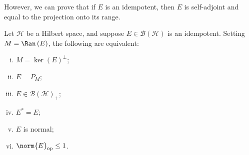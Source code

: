 \documentclass[10pt]{mypackage}
\begin{document}
However, we can prove that if $E$ is an idempotent, then $E$ is self-adjoint and equal to the projection onto its range.
\begin{proposition}
  Let $\mathcal{H}$ be a Hilbert space, and suppose $E\in \mathcal{B}\left(\mathcal{H}\right)$ is an idempotent. Setting $M = \Ran\left(E\right)$, the following are equivalent:
  \begin{enumerate}[(i)]
    \item $M = \ker\left(E\right)^{\perp}$;
    \item $E = P_M$;
    \item $E \in \mathcal{B}\left(\mathcal{H}\right)_{+}$;
    \item $E^{\ast}=E$;
    \item $E$ is normal;
    \item $\norm{E}_{\text{op}}\leq 1$.
  \end{enumerate}
\end{proposition}
\end{document}
